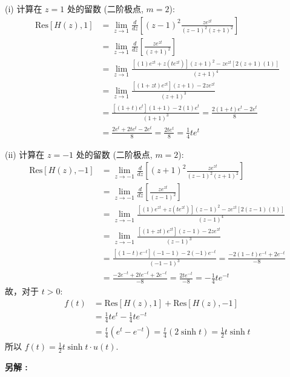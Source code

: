 \documentclass[linespread=1.5,openany]{book}%
\def\diff{d}%
\theoremstyle{plain}
\newcommand{\diff}{\mathop{}\!\mathrm{d}}  %
\begin{document}
{{{{{{{									(i) 计算在 $z=1$ 处的留数 (二阶极点, $m=2$):
									\begin{align*}
										\text{Res}[H(z), 1] &= \lim_{z\to 1} \frac{\diff}{\diff z} \left[ (z-1)^2 \frac{z e^{zt}}{(z-1)^2(z+1)^2} \right] \\[6pt]
										&= \lim_{z\to 1} \frac{\diff}{\diff z} \left[ \frac{z e^{zt}}{(z+1)^2} \right] \\[6pt]
										&= \lim_{z\to 1} \frac{[(1)e^{zt} + z(te^{zt})](z+1)^2 - z e^{zt} [2(z+1)(1)]}{(z+1)^4} \\[6pt]
										&= \lim_{z\to 1} \frac{[(1+zt)e^{zt}](z+1) - 2z e^{zt}}{(z+1)^3} \\[6pt]
										&= \frac{[(1+t)e^t](1+1) - 2(1)e^t}{(1+1)^3} = \frac{2(1+t)e^t - 2e^t}{8} \\[6pt]
										&= \frac{2e^t + 2te^t - 2e^t}{8} = \frac{2te^t}{8} = \frac{1}{4}te^t
									\end{align*}
									
									(ii) 计算在 $z=-1$ 处的留数 (二阶极点, $m=2$):
									\begin{align*}
										\text{Res}[H(z), -1] &= \lim_{z\to -1} \frac{\diff}{\diff z} \left[ (z+1)^2 \frac{z e^{zt}}{(z-1)^2(z+1)^2} \right] \\[6pt]
										&= \lim_{z\to -1} \frac{\diff}{\diff z} \left[ \frac{z e^{zt}}{(z-1)^2} \right] \\[6pt]
										&= \lim_{z\to -1} \frac{[(1)e^{zt} + z(te^{zt})](z-1)^2 - z e^{zt} [2(z-1)(1)]}{(z-1)^4} \\[6pt]
										&= \lim_{z\to -1} \frac{[(1+zt)e^{zt}](z-1) - 2z e^{zt}}{(z-1)^3} \\[6pt]
										&= \frac{[(1-t)e^{-t}](-1-1) - 2(-1)e^{-t}}{(-1-1)^3} = \frac{-2(1-t)e^{-t} + 2e^{-t}}{-8} \\[6pt]
										&= \frac{-2e^{-t} + 2te^{-t} + 2e^{-t}}{-8} = \frac{2te^{-t}}{-8} = -\frac{1}{4}te^{-t}
									\end{align*}
									故，对于 $t>0$:
									\begin{align*}
										f(t) &= \text{Res}[H(z), 1] + \text{Res}[H(z), -1] \\[6pt]
										&= \frac{1}{4}te^t - \frac{1}{4}te^{-t} \\[6pt]
										&= \frac{t}{4}(e^t - e^{-t}) = \frac{t}{4} (2\sinh t) = \frac{1}{2}t\sinh t
									\end{align*}
									所以 $f(t) = \frac{1}{2}t\sinh t \cdot u(t)$.
									
									\noindent\textbf{另解 :}
									
}}}}}}}
\end{document}
